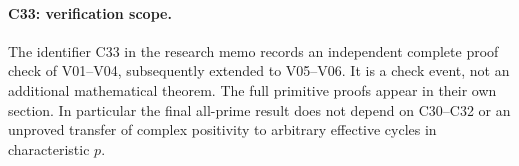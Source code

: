 \paragraph{C33: verification scope.}
The identifier C33 in the research memo records an independent complete proof check of V01--V04, subsequently extended to V05--V06. It is a check event, not an additional mathematical theorem. The full primitive proofs appear in their own section. In particular the final all-prime result does not depend on C30--C32 or an unproved transfer of complex positivity to arbitrary effective cycles in characteristic $p$.
